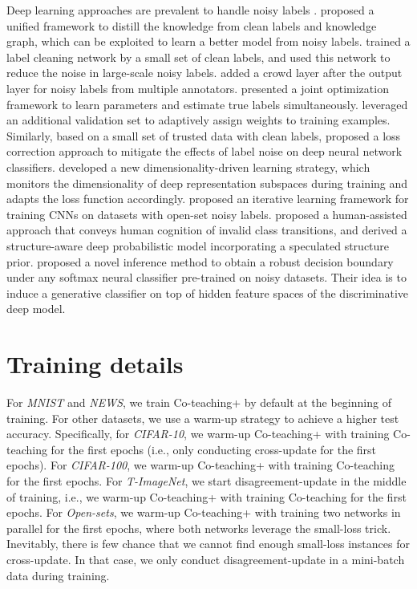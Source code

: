 \documentclass{article}
\begin{document}
Deep learning approaches are prevalent to handle noisy labels \cite{zhang2018generalized}.
\citet{li2017learning} proposed a unified framework to distill the knowledge from clean labels and knowledge graph, which can be exploited to learn a better model from noisy labels.
\citet{veit2017learning} trained a label cleaning network by a small set of clean labels, and used this network to reduce the noise in large-scale noisy labels.
\citet{rodrigues2017deep} added a crowd layer after the output layer for noisy labels from multiple annotators.
\citet{tanaka2018joint} presented a joint optimization framework to learn parameters and estimate true labels simultaneously.
\citet{ren2018learning} leveraged an additional validation set to adaptively assign weights to training examples. Similarly, based on a small set of trusted data with clean labels,
\citet{hendrycks2018using} proposed a loss correction approach to mitigate the effects of label noise on deep neural network classifiers.
\citet{ma2018dimensionality} developed a new dimensionality-driven learning
strategy, which monitors the dimensionality of deep representation subspaces during training and adapts the loss function accordingly.
\citet{wang2018iterative} proposed an iterative learning framework for training
CNNs on datasets with open-set noisy labels.
\citet{han2018masking} proposed a human-assisted approach that conveys human cognition of invalid class transitions, and derived a structure-aware deep probabilistic model incorporating a speculated structure prior.
\citet{lee2019robust} proposed a novel inference method to obtain a robust decision boundary under any softmax neural classifier pre-trained on noisy datasets. Their idea is to induce a generative classifier on top of hidden
feature spaces of the discriminative deep model.

\section{Training details}
For \textit{MNIST} and \textit{NEWS}, we train Co-teaching+ by default at the beginning of training. For other datasets, we use a warm-up strategy to achieve a higher test accuracy. Specifically, for \textit{CIFAR-10}, we warm-up Co-teaching+ with training Co-teaching for the first  epochs (i.e., only conducting cross-update for the first  epochs). For \textit{CIFAR-100}, we warm-up Co-teaching+ with training Co-teaching for the first  epochs. For \textit{T-ImageNet}, we start disagreement-update in the middle of training, i.e., we warm-up Co-teaching+ with training Co-teaching for the first  epochs. For \textit{Open-sets}, we warm-up Co-teaching+ with training two networks in parallel for the first  epochs, where both networks leverage the small-loss trick. Inevitably, there is few chance that we cannot find enough small-loss instances for cross-update. In that case, we only conduct disagreement-update in a mini-batch data during training.
\end{document}
